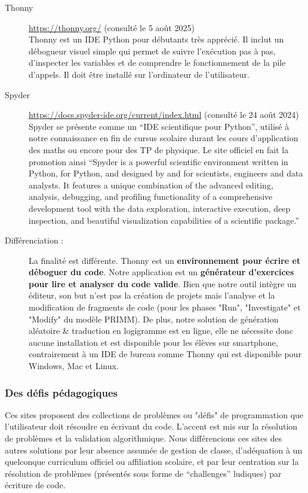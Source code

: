 \documentclass[11pt,a4paper]{article}
\begin{document}
\begin{description}
    \item[Thonny] \url{https://thonny.org/} (consulté le 5 août 2025) \\
    Thonny est un IDE Python pour débutants très apprécié. Il inclut un débogueur visuel simple qui permet de suivre l'exécution pas à pas, d'inspecter les variables et de comprendre le fonctionnement de la pile d'appels. Il doit être installé sur l'ordinateur de l'utilisateur.
     \item[Spyder] \url{https://docs.spyder-ide.org/current/index.html} (consulté le 24 août 2024)\\
     Spyder se présente comme un ``IDE scientifique pour Python'', utilisé à notre connaissance en fin de cursus scolaire durant les cours d'application des maths ou encore pour des TP de physique. Le site officiel en fait la promotion ainsi ``Spyder is a powerful scientific environment written in Python, for Python, and designed by and for scientists, engineers and data analysts. It features a unique combination of the advanced editing, analysis, debugging, and profiling functionality of a comprehensive development tool with the data exploration, interactive execution, deep inspection, and beautiful visualization capabilities of a scientific package.''
     
    \item[Différenciation :] La finalité est différente. Thonny est un \textbf{environnement pour écrire et déboguer du code}. Notre application est un \textbf{générateur d'exercices pour lire et analyser du code valide}. Bien que notre outil intègre un éditeur, son but n'est pas la création de projets mais l'analyse et la modification de fragments de code (pour les phases "Run", "Investigate" et "Modify" du modèle PRIMM). De plus, notre solution de génération aléatoire \& traduction en logigramme est en ligne, elle ne nécessite donc aucune installation et est disponible pour les élèves sur smartphone, contrairement à un IDE de bureau comme Thonny qui est disponible pour Windows, Mac et Linux.
\end{description}

\subsubsection*{Des défis pédagogiques}
Ces sites proposent des collections de problèmes ou "défis" de programmation que l'utilisateur doit résoudre en écrivant du code. L'accent est mis sur la résolution de problèmes et la validation algorithmique. Nous différencions ces sites des autres solutions par leur absence assumée de gestion de classe, d'adéquation à un quelconque curriculum officiel ou affiliation scolaire, et par leur centration sur la résolution de problèmes (présentés sous forme de ``challenges'' ludiques) par écriture de code.
\end{document}
